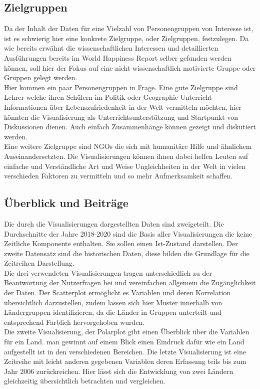 \subsection{Zielgruppen}

Da der Inhalt der Daten für eine Vielzahl von Personengruppen von Interesse ist, ist es schwierig hier eine konkrete Zielgruppe, oder Zielgruppen, festzulegen. Da wie bereits erwähnt die wissenschaftlichen Interessen und detaillierten Ausführungen bereits im World Happiness Report selber gefunden werden können, soll hier der Fokus auf eine nicht-wissenschaftlich motivierte Gruppe oder Gruppen gelegt werden. \\

Hier kommen ein paar Personengruppen in Frage. Eine gute Zielgruppe sind Lehrer welche ihren Schülern im Politik oder Geographie Unterricht Informationen über Lebenszufriedenheit in der Welt vermitteln möchten, hier könnten die Visualisierung als Unterrichtsunterstützung und Startpunkt von Diskussionen dienen. Auch einfach Zusammenhänge können gezeigt und diskutiert werden. \\

Eine weitere Zielgruppe sind NGOs die sich mit humanitäre Hilfe und ähnlichem Auseinandersetzten. Die Visualisierungen können ihnen dabei helfen Leuten auf einfache und Verständliche Art und Weise Ungleichheiten in der Welt in vielen verschieden Faktoren zu vermitteln und so mehr Aufmerksamkeit schaffen. 

\subsection{Überblick und Beiträge}
Die durch die Visualisierungen dargestellten Daten sind zweigeteilt. Die Durchschnitte der Jahre 2018-2020 sind die Basis aller Visualisierungen die keine Zeitliche Komponente enthalten. Sie sollen einen Ist-Zustand darstellen. Der zweite Datensatz sind die historischen Daten, diese bilden die Grundlage für die Zeitreihen Darstellung. \\

Die drei verwendeten Visualisierungen tragen unterschiedlich zu der Beantwortung der Nutzerfragen bei und vereinfachen allgemein die Zugänglichkeit der Daten. Der Scatterplot ermöglicht es Variablen und deren Korrelation übersichtlich darzustellen, zudem lassen sich hier Muster innerhalb von Ländergruppen identifizieren, da die Länder in Gruppen unterteilt und entsprechend Farblich hervorgehoben wurden. \\

Die zweite Visualisierung, der Polarplot gibt einen Überblick über die Variablen für ein Land. man gewinnt auf einem Blick einen Eindruck dafür wie ein Land aufgestellt ist in den verschiedenen Bereichen. Die letzte Visualisierung ist eine Zeitreihe mit leicht anderen gegebenen Variablen deren Erfassung teils bis zum Jahr 2006 zurückreichen. Hier lässt sich die Entwicklung von zwei Ländern gleichzeitig übersichtlich betrachten und vergleichen. \\